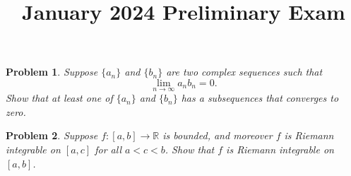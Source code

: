 \documentclass[11pt,twoside]{amsart}
\title{January 2024 Preliminary Exam}
\author{}
\theoremstyle{plain}
\newtheorem{prob}{Problem}
\newcommand{\RR}{\mathbb{R}}
\begin{document}
\maketitle

\begin{prob}
  Suppose $\{a_n\}$ and $\{b_n\}$ are two complex sequences such that 
  \begin{equation*}
    \lim_{n \to \infty}{a_n b_n} = 0.
  \end{equation*}
  Show that at least one of $\{a_n\}$ and $\{b_n\}$ has a subsequences that converges to zero.
\end{prob}

\begin{prob}
  Suppose $f: [a,b] \to \RR$ is bounded, and moreover $f$ is Riemann integrable on $[a,c]$
  for all $a < c < b$. Show that $f$ is Riemann integrable on $[a,b]$. 
\end{prob}
    
\end{document}
